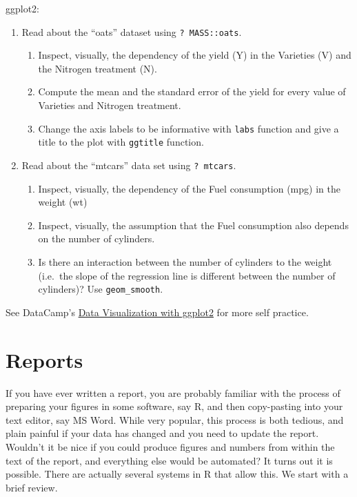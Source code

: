 \documentclass[]{book}
\providecommand{\tightlist}{%
  \setlength{\itemsep}{0pt}\setlength{\parskip}{0pt}}
\theoremstyle{definition}
\theoremstyle{definition}
\theoremstyle{definition}
\theoremstyle{remark}
\begin{document}
ggplot2:

\begin{enumerate}
\def\labelenumi{\arabic{enumi}.}
\tightlist
\item
  Read about the ``oats'' dataset using \texttt{?\ MASS::oats}.

  \begin{enumerate}
  \def\labelenumii{\arabic{enumii}.}
  \tightlist
  \item
    Inspect, visually, the dependency of the yield (Y) in the Varieties
    (V) and the Nitrogen treatment (N).
  \item
    Compute the mean and the standard error of the yield for every value
    of Varieties and Nitrogen treatment.
  \item
    Change the axis labels to be informative with \texttt{labs} function
    and give a title to the plot with \texttt{ggtitle} function.
  \end{enumerate}
\item
  Read about the ``mtcars'' data set using \texttt{?\ mtcars}.

  \begin{enumerate}
  \def\labelenumii{\arabic{enumii}.}
  \tightlist
  \item
    Inspect, visually, the dependency of the Fuel consumption (mpg) in
    the weight (wt)
  \item
    Inspect, visually, the assumption that the Fuel consumption also
    depends on the number of cylinders.
  \item
    Is there an interaction between the number of cylinders to the
    weight (i.e.~the slope of the regression line is different between
    the number of cylinders)? Use \texttt{geom\_smooth}.
  \end{enumerate}
\end{enumerate}

See DataCamp's
\href{https://www.datacamp.com/courses/data-visualization-with-ggplot2-1}{Data
Visualization with ggplot2} for more self practice.

\chapter{Reports}\label{report}

If you have ever written a report, you are probably familiar with the
process of preparing your figures in some software, say R, and then
copy-pasting into your text editor, say MS Word. While very popular,
this process is both tedious, and plain painful if your data has changed
and you need to update the report. Wouldn't it be nice if you could
produce figures and numbers from within the text of the report, and
everything else would be automated? It turns out it is possible. There
are actually several systems in R that allow this. We start with a brief
review.
\end{document}
